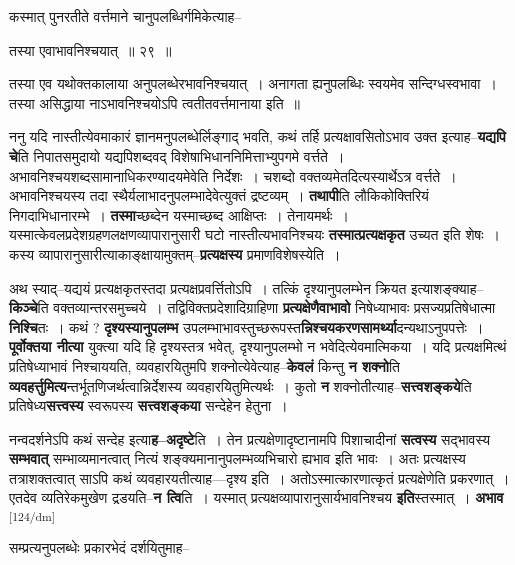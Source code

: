 \documentclass[article,12pt,a4paper]{memoir}
\begin{document}
	  \pstart कस्मात् पुनरतीते वर्त्तमाने चानुपलब्धिर्गमिकेत्याह--
	\pend
       

	  \pstart तस्या एवाभावनिश्चयात् ॥ २९ ॥
	\pend
       

	  \pstart तस्या एव यथोक्तकालाया अनुपलब्धेरभावनिश्चयात् । अनागता ह्यनुपलब्धिः स्वयमेव सन्दिग्धस्वभावा । तस्या असिद्धाया नाऽभावनिश्चयोऽपि त्वतीतवर्त्तमानाया इति ॥
	\pend
      

	  \pstart ननु यदि नास्तीत्येवमाकारं ज्ञानमनुपलब्धेर्लिङ्गाद् भवति, कथं तर्हि प्रत्यक्षावसितोऽभाव उक्त इत्याह--\textbf{यद्यपि चे}ति निपातसमुदायो यद्यपिशब्दवद् विशेषाभिधाननिमित्ताभ्युपगमे वर्त्तते । अभावनिश्चयशब्दसामानाधिकरण्यादयमेवेति निर्देशः । चशब्दो वक्तव्यमेतदित्यस्यार्थेऽत्र वर्त्तते । अभावनिश्चयस्य तदा स्थैर्यलाभादनुपलम्भादेवेत्युक्तं द्रष्टव्यम् । \textbf{तथापी}ति लौकिकोक्तिरियं निगदाभिधानारम्भे । \textbf{तस्मा}च्छब्देन यस्माच्छब्द आक्षिप्तः । तेनायमर्थः । यस्मात्केवलप्रदेशग्रहणलक्षणव्यापारानुसारी घटो नास्तीत्यभावनिश्चयः \textbf{तस्मात्प्रत्यक्षकृत} उच्यत इति शेषः । कस्य व्यापारानुसारीत्याकाङ्क्षायामुक्तम्--\textbf{प्रत्यक्षस्य} प्रमाणविशेषस्येति ।
	\pend
      

	  \pstart अथ स्याद्--यद्ययं प्रत्यक्षकृतस्तदा प्रत्यक्षप्रवर्त्तितोऽपि । तत्किं दृश्यानुपलम्भेन क्रियत इत्याशङ्क्याह--\textbf{किञ्चे}ति वक्तव्यान्तरसमुच्चये । तद्विविक्तप्रदेशादिग्राहिणा \textbf{प्रत्यक्षेणैवाभावो} निषेध्याभावः प्रसज्यप्रतिषेधात्मा \textbf{निश्चि}तः । कथं ? \textbf{दृश्यस्यानुपलम्भ} उपलम्भाभावस्तुच्छरूपस्त\textbf{न्निश्चयकरणसामर्थ्या}दन्यथाऽनुपपत्तेः । \textbf{पूर्वोक्तया नीत्या} युक्त्या यदि हि दृश्यस्तत्र भवेत्, दृश्यानुपलम्भो न भवेदित्येवमात्मिकया । यदि प्रत्यक्षमित्थं प्रतिषेध्याभावं निश्चाययति, व्यवहारयितुमपि शक्नोत्येवेत्याह--\textbf{केवलं} किन्तु \textbf{न शक्नो}ति \textbf{व्यवहर्त्तुमित्य}न्तर्भूतणिजर्थत्वान्निर्देशस्य व्यवहारयितुमित्यर्थः । कुतो \textbf{न} शक्नोतीत्याह--\textbf{सत्त्वशङ्कये}ति प्रतिषेध्य\textbf{सत्त्वस्य} स्वरूपस्य \textbf{सत्त्वशङ्कया} सन्देहेन हेतुना ।
	\pend
      

	  \pstart नन्वदर्शनेऽपि कथं सन्देह इत्या\textbf{ह--अदृष्टे}ति । तेन प्रत्यक्षेणादृष्टानामपि पिशाचादीनां \textbf{सत्वस्य} सद्भावस्य \textbf{सम्भवात्} सम्भाव्यमानत्वात् नित्यं शङ्क्यमानानुपलम्भव्यभिचारो ह्यभाव इति भावः । अतः प्रत्यक्षस्य तत्राशक्तत्वात् साऽपि कथं व्यवहारयतीत्याह—दृश्य इति । अतोऽस्मात्कारणात्कृतं प्रत्यक्षेणेति प्रकरणात् । एतदेव व्यतिरेकमुखेण द्रडयति--\textbf{न त्वि}ति । यस्मात् प्रत्यक्षव्यापारानुसार्यभावनिश्चय \textbf{इति}स्तस्मात् । \textbf{अभाव}  \leavevmode\textsuperscript{\rmlatinfont\tiny [124/dm]} 
	  
	सम्प्रत्यनुपलब्धेः प्रकारभेदं दर्शयितुमाह-- 
	  
\end{document}
